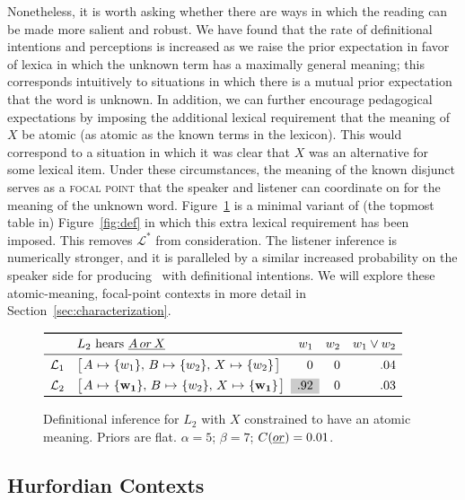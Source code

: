 \documentclass[12pt,twoside]{article}
\makeatletter
\newcommand{\secref}[1]{Section~\ref{#1}}
\newcommand{\Figref}[1]{Figure~\ref{#1}}
\newcommand{\figref}[1]{Figure~\ref{#1}}
\newcommand{\word}[1]{\emph{#1}}
\newcommand{\set}[1]{\ensuremath{\left\{ #1 \right\}}}
\newcommand{\Lex}{\mathcal{L}}
\newcommand{\LexStar}{\Lex^{\ast}}
\newcommand{\Costs}{C}
\newcommand{\ListenerK}[1][k]{L_{#1}}
\newcommand{\definitional}[1]{\mathbf{#1}}
\newcommand{\graycell}[1]{{\cellcolor[gray]{.8}#1}}
\newcommand{\smalldisjlex}[3]{
  \setlength{\arraycolsep}{1pt}
  \left[
    \begin{array}[c]{l@{ \ \mapsto \ }r@{, \ } l@{ \ \mapsto \ }r@{, \ } l@{ \ \mapsto \ }r}
      A & \set{#1} &
      B & \set{#2} &
      X & \set{#3}
    \end{array}
  \right]}
\newcommand{\smalldisjlexTargetDef}{\smalldisjlex{\definitional{w_{1}}}{w_{2}}{\definitional{w_{1}}}}
\renewcommand{\_}{\textbf{\textunderscore\hspace{-4pt}\textunderscore\hspace{-3pt}\textunderscore\hspace{-4pt}\textunderscore}\hspace{0.5pt}}			%
\newcommand{\technicalTerm}[1]{\textsc{#1}}
\makeatother
\begin{document}
Nonetheless, it is worth asking whether there are ways in which the
reading can be made more salient and robust. We have found that the
rate of definitional intentions and perceptions is increased as we
raise the prior expectation in favor of lexica in which the unknown
term has a maximally general meaning; this corresponds intuitively to
situations in which there is a mutual prior expectation that the word
is unknown. In addition, we can further encourage pedagogical
expectations by imposing the additional lexical requirement that the
meaning of $X$ be atomic (as atomic as the known terms in the
lexicon). This would correspond to a situation in which it was clear
that $X$ was an alternative for some lexical item. Under these
circumstances, the meaning of the known disjunct serves as a
\technicalTerm{focal point} \citep{Schelling60} that the speaker and
listener can coordinate on for the meaning of the unknown
word. \Figref{fig:def-focal} is a minimal variant of (the topmost
table in) \figref{fig:def} in which this extra lexical requirement has
been imposed. This removes $\LexStar$ from consideration. The listener
inference is numerically stronger, and it is paralleled by a similar
increased probability on the speaker side for producing
\AorX\ with definitional intentions. We will explore these
atomic-meaning, focal-point contexts in more detail in
\secref{sec:characterization}.

\begin{figure}[tp]
  \centering
  $\begin{array}[c]{l l r r r}
    \toprule
      & \ListenerK[2] \text{ hears } \AorX  & w_{1} & w_{2} & w_{1} \vee w_{2} \\
    \midrule
    \Lex_{1} & \smalldisjlex{w_{1}}{w_{2}}{w_{2}}  &              0 & 0 & .04 \\[1ex]
    \Lex_{2} & \smalldisjlexTargetDef             & \graycell{.92} & 0 & .03\\
    \bottomrule
  \end{array}$
  \caption{Definitional inference for $\ListenerK[2]$ with $X$ constrained to have an atomic meaning. 
    Priors are flat. 
    $\alpha = 5$; 
    $\beta = 7$; 
    $\Costs(\word{or}) = 0.01$.}
  \label{fig:def-focal}
\end{figure}


\vspace{12pt}

\subsection{Hurfordian Contexts}\label{sec:analysis:subsumptive}
\end{document}
